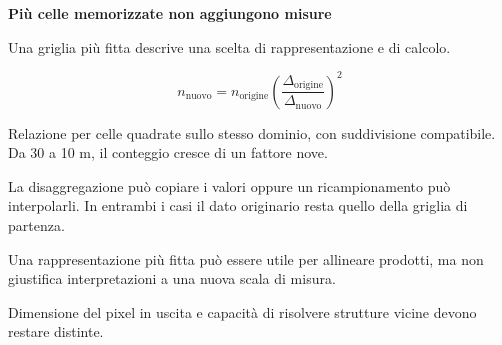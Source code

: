 \documentclass[12pt,aspectratio=1610]{beamer}
\newcommand{\PBody}[1]{\par{\fontsize{11.3}{14.8}\selectfont #1\par}}
\newcommand{\PSmall}[1]{\par{\fontsize{9.8}{13.1}\selectfont #1\par}}
\newcommand{\PInfo}[1]{%
\begin{tcolorbox}[enhanced,arc=1.6mm,boxrule=.55pt,colback=GeoTint,
 colframe=Rule!80!Classical,left=2.3mm,right=2.3mm,top=2mm,bottom=2mm,
 before skip=1mm,after skip=1mm]
\PSmall{#1}\end{tcolorbox}}
\begin{document}
\begin{frame}[plain]\hypertarget{slide38}{}
\begin{lrbox}{\TitleBox}
\begin{minipage}[t]{17.7cm}\raggedright\color{Ink}\fontsize{11.3}{14.8}\selectfont
\color{Navy}\bfseries\fontsize{20.6}{24.5}\selectfont Più celle memorizzate non aggiungono misure
\end{minipage}\end{lrbox}

\begin{lrbox}{\RecallBox}
\begin{minipage}[t]{14.3cm}\raggedright\color{Ink}\fontsize{11.3}{14.8}\selectfont
\fontsize{10.3}{13.8}\selectfont Una griglia più fitta descrive una scelta di rappresentazione e di calcolo.
\end{minipage}\end{lrbox}

\begin{lrbox}{\PilotLeftBox}
\begin{minipage}[t]{10.05cm}\raggedright\color{Ink}\fontsize{11.3}{14.8}\selectfont
\[n_{\mathrm{nuovo}}=n_{\mathrm{origine}}
 \left(\frac{\Delta_{\mathrm{origine}}}{\Delta_{\mathrm{nuovo}}}\right)^2\]
\PInfo{Relazione per celle quadrate sullo stesso dominio, con suddivisione compatibile. Da 30 a 10 m, il conteggio cresce di un fattore nove.}

\end{minipage}\end{lrbox}

\begin{lrbox}{\PilotRightBox}
\begin{minipage}[t]{7.55cm}\raggedright\color{Ink}\fontsize{11.3}{14.8}\selectfont
\PBody{La disaggregazione può copiare i valori oppure un ricampionamento può interpolarli. In entrambi i casi il dato originario resta quello della griglia di partenza.}
\vspace{2.5mm}
\PBody{Una rappresentazione più fitta può essere utile per allineare prodotti, ma non giustifica interpretazioni a una nuova scala di misura.}
\vspace{2.5mm}
\PSmall{Dimensione del pixel in uscita e capacità di risolvere strutture vicine devono restare distinte.}


\end{minipage}
\end{lrbox}
\end{frame}
\end{document}
